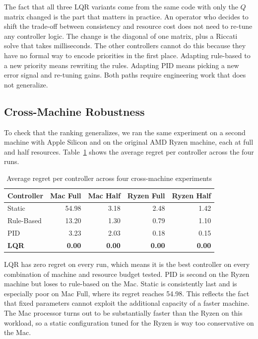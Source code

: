 \documentclass[10pt,a4paper]{article}
\begin{document}
The fact that all three LQR variants come from the same code with only the $Q$ matrix changed is the part that matters in practice. An operator who decides to shift the trade-off between consistency and resource cost does not need to re-tune any controller logic. The change is the diagonal of one matrix, plus a Riccati solve that takes milliseconds. The other controllers cannot do this because they have no formal way to encode priorities in the first place. Adapting rule-based to a new priority means rewriting the rules. Adapting PID means picking a new error signal and re-tuning gains. Both paths require engineering work that does not generalize.

\subsection{Cross-Machine Robustness}

To check that the ranking generalizes, we ran the same experiment on a second machine with Apple Silicon and on the original AMD Ryzen machine, each at full and half resources. Table~\ref{tab:cross} shows the average regret per controller across the four runs.

\begin{table}[H]
\centering
\caption{Average regret per controller across four cross-machine experiments}
\label{tab:cross}
\begin{tabular}{lrrrr}
\toprule
\textbf{Controller} & \textbf{Mac Full} & \textbf{Mac Half} & \textbf{Ryzen Full} & \textbf{Ryzen Half} \\
\midrule
Static     & 54.98 & 3.18 & 2.48 & 1.42 \\
Rule-Based & 13.20 & 1.30 & 0.79 & 1.10 \\
PID        & 3.23  & 2.03 & 0.18 & 0.15 \\
\textbf{LQR} & \textbf{0.00} & \textbf{0.00} & \textbf{0.00} & \textbf{0.00} \\
\bottomrule
\end{tabular}
\end{table}

LQR has zero regret on every run, which means it is the best controller on every combination of machine and resource budget tested. PID is second on the Ryzen machine but loses to rule-based on the Mac. Static is consistently last and is especially poor on Mac Full, where its regret reaches 54.98. This reflects the fact that fixed parameters cannot exploit the additional capacity of a faster machine. The Mac processor turns out to be substantially faster than the Ryzen on this workload, so a static configuration tuned for the Ryzen is way too conservative on the Mac.
\end{document}
